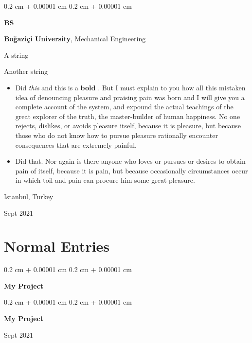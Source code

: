 \documentclass[10pt, letterpaper]{article}
\newenvironment{summary}{
    \begin{description}[
        topsep=0.10 cm,
        parsep=0.10 cm,
        partopsep=0pt,
        itemsep=0pt,
        leftmargin=0.4 cm + 10pt
    ]
}{
    \end{description}
} %
\newenvironment{highlights}{
    \begin{itemize}[
        topsep=0.10 cm,
        parsep=0.10 cm,
        partopsep=0pt,
        itemsep=0pt,
        leftmargin=0.4 cm + 10pt
    ]
}{
    \end{itemize}
} %
\newenvironment{onecolentry}{
    \begin{adjustwidth}{
        0.2 cm + 0.00001 cm
    }{
        0.2 cm + 0.00001 cm
    }
}{
    \end{adjustwidth}
} %
\newenvironment{twocolentry}[2][]{
    \onecolentry
    \def\secondColumn{#2}
    \setcolumnwidth{\fill, 4.5 cm}
    \begin{paracol}{2}
}{
    \switchcolumn \raggedleft \secondColumn
    \end{paracol}
    \endonecolentry
} %
\newenvironment{threecolentry}[3][]{
    \onecolentry
    \def\thirdColumn{#3}
    \setcolumnwidth{1 cm, \fill, 4.5 cm}
    \begin{paracol}{3}
    {\raggedright #2} \switchcolumn
}{
    \switchcolumn \raggedleft \thirdColumn
    \end{paracol}
    \endonecolentry
} %
\let\hrefWithoutArrow\href
\renewcommand{\href}[2]{\hrefWithoutArrow{#1}{\ifthenelse{\equal{#2}{}}{ }{#2 }\raisebox{.15ex}{\footnotesize \faExternalLink*}}}
\begin{document}
        \begin{threecolentry}{\textbf{BS}}{
            Istanbul, Turkey

        Sept 2021
        }
            \textbf{Boğaziçi University}, Mechanical Engineering
            \begin{summary}
                \item A string
                \item Another string
            \end{summary}
            \begin{highlights}
                \item Did \textit{this} and this is a \textbf{bold} \href{https://example.com}{link}. But I must explain to you how all this mistaken idea of denouncing pleasure and praising pain was born and I will give you a complete account of the system, and expound the actual teachings of the great explorer of the truth, the master-builder of human happiness. No one rejects, dislikes, or avoids pleasure itself, because it is pleasure, but because those who do not know how to pursue pleasure rationally encounter consequences that are extremely painful.
                \item Did that. Nor again is there anyone who loves or pursues or desires to obtain pain of itself, because it is pain, but because occasionally circumstances occur in which toil and pain can procure him some great pleasure.
            \end{highlights}
        \end{threecolentry}


    
    \section{Normal Entries}



        
        \begin{onecolentry}
            \textbf{My Project}
        \end{onecolentry}


        \vspace{0.2 cm}

        \begin{twocolentry}{
            Sept 2021
        }
            \textbf{My Project}
        \end{twocolentry}


        \vspace{0.2 cm}
\end{document}
